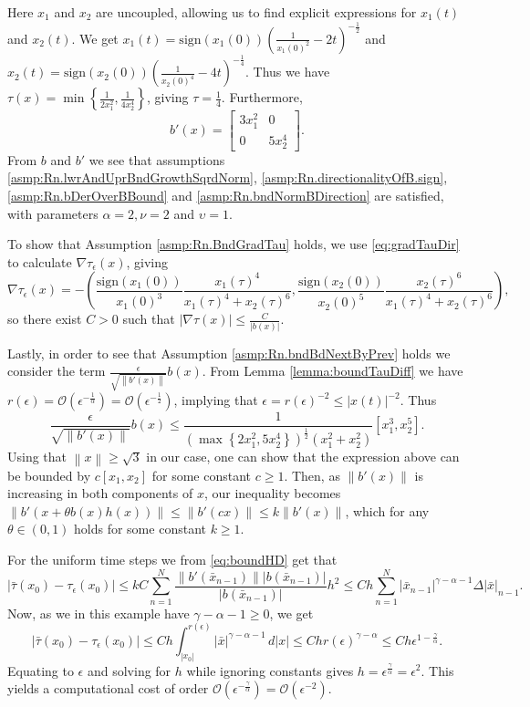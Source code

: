 \documentclass[a4paper, oneside, reqno]{amsart}
\newcommand{\abs}[1]{\left\lvert#1\right\rvert}
\newcommand{\norm}[1]{\left\|#1\right\|}
\theoremstyle{remark}
\begin{document}
Here \(x_1\) and \(x_2\) are uncoupled, allowing us to find explicit expressions for \(x_1(t)\) and \(x_2(t)\). 
We get \(x_1(t) = \text{sign}(x_1(0))\left(\frac{1}{x_1(0)^2} -2t\right)^{-\frac{1}{2}}\) and \(x_2(t) = \text{sign}(x_2(0))\left(\frac{1}{x_2(0)^4} -4t\right)^{-\frac{1}{4}}\). 
Thus we have \(\tau(x) = \min\left\{\frac{1}{2x_1^2}, \frac{1}{4x_2^4}\right\}\), giving \(\tau=\frac{1}{4}\). 
Furthermore, 
\[b'(x) = 
    \begin{bmatrix}
        3x_1^2 & 0 \\
           0 & 5x_2^4 
    \end{bmatrix}.
\]
From \(b\) and \(b'\) we see that assumptions \ref{asmp:Rn.lwrAndUprBndGrowthSqrdNorm}, \ref{asmp:Rn.directionalityOfB.sign}, \ref{asmp:Rn.bDerOverBBound} and \ref{asmp:Rn.bndNormBDirection} are satisfied, with parameters \(\alpha = 2, \nu = 2\) and \(\upsilon = 1\). 


To show that Assumption \ref{asmp:Rn.BndGradTau} holds, we use \eqref{eq:gradTauDir} to calculate \(\nabla\tau_\epsilon(x)\), giving
\[\nabla\tau_\epsilon(x) = -\left(\frac{\text{sign}(x_1(0))}{x_1(0)^3}\frac{x_1(\tau)^4}{x_1(\tau)^4 + x_2(\tau)^6}, \frac{\text{sign}(x_2(0))}{x_2(0)^5}\frac{x_2(\tau)^6}{x_1(\tau)^4 + x_2(\tau)^6}\right),\]
so there exist \(C>0\) such that \(\abs{\nabla\tau(x)} \leq \frac{C}{\abs{b(x)}}\).

Lastly, in order to see that Assumption \ref{asmp:Rn.bndBdNextByPrev} holds we consider the term \(\frac{\epsilon}{\sqrt{\norm{b'(x)}}}b(x)\). From Lemma \ref{lemma:boundTauDiff} we have \(r(\epsilon) = \mathcal{O}(\epsilon^{-\frac{1}{\alpha}}) = \mathcal{O}(\epsilon^{-\frac{1}{2}})\), implying that \(\epsilon = r(\epsilon)^{-2} \leq \abs{x(t)}^{-2}\). 
Thus
\[\frac{\epsilon}{\sqrt{\norm{b'(x)}}}b(x) \leq \frac{1}{\left(\max\left\{2x_1^2, 5x_2^4\right\}\right)^{\frac{1}{2}}(x_1^2+x_2^2)}[x_1^3, x_2^5].\]
Using that \(\norm{x} \geq \sqrt{3}\) in our case, one can show that the expression above can be bounded by \(c[x_1, x_2]\) for some constant \(c\geq1\). 
Then, as \(\norm{b'(x)}\) is increasing in both components of \(x\), our inequality becomes \(\norm{b'(x + \theta b(x)h(x))} \leq \norm{b'(cx)} \leq k\norm{b'(x)}\), which for any \(\theta\in(0,1)\) holds for some constant \(k\geq1\). 

For the uniform time steps we from \eqref{eq:boundHD} get that
\[\abs{\bar\tau(x_0)-\tau_{\epsilon}(x_0)} \leq kC\sum_{n=1}^N \frac{\norm{b'(\bar x_{n-1})}\abs{b(\bar x_{n-1})}}{\abs{b(\bar x_{n-1})}}h^2 \leq Ch\sum_{n=1}^N \abs{\bar x_{n-1}}^{\gamma -\alpha-1}\Delta\abs{\bar x}_{n-1}.\] 
Now, as we in this example have \(\gamma-\alpha-1  \geq 0\), we get
\[\abs{\bar\tau(x_0)-\tau_{\epsilon}(x_0)} \leq Ch\int_{\abs{x_0}}^{r(\epsilon)}\abs{\bar x}^{\gamma - \alpha - 1}\,d\abs{x} \leq Chr(\epsilon)^{\gamma-\alpha} \leq Ch\epsilon^{1-\frac{\gamma}{\alpha}}.\]
Equating to \(\epsilon\) and solving for \(h\) while ignoring constants gives \(h = \epsilon^\frac{\gamma}{\alpha} = \epsilon^{2}\). This yields a computational cost of order \(\mathcal{O}\left(\epsilon^{-\frac{\gamma}{\alpha}}\right) = \mathcal{O}\left(\epsilon^{-2}\right)\). 
\end{document}
